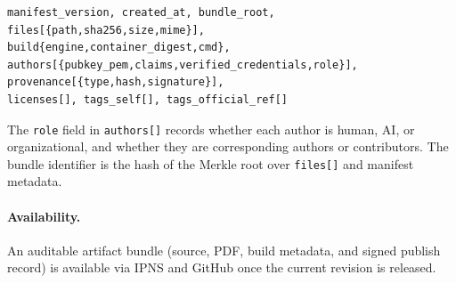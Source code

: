 \documentclass[11pt]{article}
\begin{document}
\begin{lstlisting}
manifest_version, created_at, bundle_root,
files[{path,sha256,size,mime}],
build{engine,container_digest,cmd},
authors[{pubkey_pem,claims,verified_credentials,role}],
provenance[{type,hash,signature}],
licenses[], tags_self[], tags_official_ref[]
\end{lstlisting}

The \texttt{role} field in \texttt{authors[]} records whether each
author is human, AI, or organizational, and whether they are
corresponding authors or contributors.
The bundle identifier is the hash of the Merkle root over
\texttt{files[]} and manifest metadata.

\paragraph{Availability.}
An auditable artifact bundle (source, PDF, build metadata, and signed
publish record) is available via IPNS and GitHub once the current
revision is released.

\end{document}
